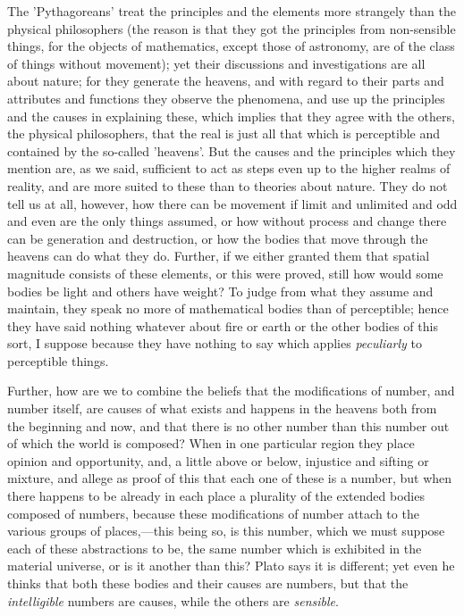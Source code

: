 The 'Pythagoreans' treat the principles and the elements more strangely than the physical philosophers (the reason is that they got the principles from non-sensible things, for the objects of mathematics, except those of astronomy, are of the class of things without movement); yet their discussions and investigations are all about nature; for they generate the heavens, and with regard to their parts and attributes and functions they observe the phenomena, and use up the principles and the causes in explaining these, which implies that they agree with the others, the physical philosophers, that the real is just all that which is perceptible and contained by the so-called 'heavens'. But the causes and the principles which they mention are, as we said, sufficient to act as steps even up to the higher realms of reality, and are more suited to these than to theories about nature. They do not tell us at all, however, how there can be movement if limit and unlimited and odd and even are the only things assumed, or how without process and change there can be generation and destruction, or how the bodies that move through the heavens can do what they do. Further, if we either granted them that spatial magnitude consists of these elements, or this were proved, still how would some bodies be light and others have weight? To judge from what they assume and maintain, they speak no more of mathematical bodies than of perceptible; hence they have said nothing whatever about fire or earth or the other bodies of this sort, I suppose because they have nothing to say which applies \emph{peculiarly} to perceptible things.

Further, how are we to combine the beliefs that the modifications of number, and number itself, are causes of what exists and happens in the heavens both from the beginning and now, and that there is no other number than this number out of which the world is composed? When in one particular region they place opinion and opportunity, and, a little above or below, injustice and sifting or mixture, and allege as proof of this that each one of these is a number, but when there happens to be already in each place a plurality of the extended bodies composed of numbers, because these modifications of number attach to the various groups of places,—this being so, is this number, which we must suppose each of these abstractions to be, the same number which is exhibited in the material universe, or is it another than this? Plato says it is different; yet even he thinks that both these bodies and their causes are numbers, but that the \emph{intelligible} numbers are causes, while the others are \emph{sensible}.


